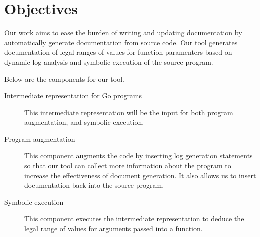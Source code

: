 \section{Objectives}

Our work aims to ease the burden of writing and updating documentation by automatically generate documentation from source code. Our tool generates documentation of legal ranges of values for function paramenters based on dynamic log analysis and symbolic execution of the source program.

Below are the components for our tool.

\begin{description}
  \item [Intermediate representation for Go programs] This intermediate representation will be the input for both program augmentation, and symbolic execution.
  \item [Program augmentation] This component augments the code by inserting log generation statements so that our tool can collect more information about the program to increase the effectiveness of document generation. It also allows us to insert documentation back into the source program.
  \item [Symbolic execution] This component executes the intermediate representation to deduce the legal range of values for arguments passed into a function.
\end{description}
